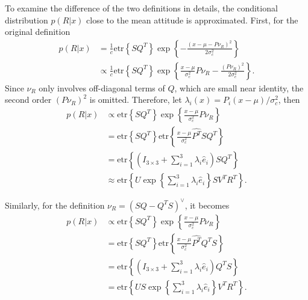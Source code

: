 \documentclass[10pt,twocolumn]{article}
\newcommand{\etr}[1]{\ensuremath{\mathrm{etr}\left\{ #1 \right\}}}
\begin{document}
To examine the difference of the two definitions in details, the conditional distribution $p(R|x)$ close to the mean attitude is approximated.
First, for the original definition
\begin{align*}
	p(R|x) &= \frac{1}{c}\etr{SQ^T}\exp\left\{ - \frac{(x-\mu-P\nu_R)^2}{2\sigma_c^2} \right\} \\
	&\propto \frac{1}{c}\etr{SQ^T} \exp\left\{ \frac{x-\mu}{\sigma_c^2}P\nu_R - \frac{(P\nu_R)^2}{2\sigma_c^2} \right\}.
\end{align*}
Since $\nu_R$ only involves off-diagonal terms of $Q$, which are small near identity, the second order $(P\nu_R)^2$ is omitted.
Therefore, let $\lambda_i(x) = P_i(x-\mu)/\sigma_c^2$, then
\begin{align*}
	p(R|x) &\propto \etr{SQ^T} \exp\left\{ \frac{x-\mu}{\sigma_c^2} P\nu_R \right\} \\
	&= \etr{SQ^T} \etr{\frac{x-\mu}{\sigma_c^2} \widehat{P^T}SQ^T} \\
	&= \etr{\left(I_{3\times 3}+\sum_{i=1}^3\lambda_i\hat{e}_i\right) SQ^T} \\
	&\approx \etr{U\exp\left\{ \sum_{i=1}^3\lambda_i\hat{e}_i \right\}SV^TR^T}.
\end{align*}

Similarly, for the definition $\nu_R = (SQ-Q^TS)^\vee$, it becomes
\begin{align*}
	p(R|x) &\propto \etr{SQ^T} \exp\left\{ \frac{x-\mu}{\sigma_c^2} P\nu_R \right\} \\
	&= \etr{SQ^T} \etr{\frac{x-\mu}{\sigma_c^2} \widehat{P^T}Q^TS} \\
	&= \etr{\left(I_{3\times 3}+\sum_{i=1}^3\lambda_i\hat{e}_i\right) Q^TS} \\
	&= \etr{US\exp\left\{ \sum_{i=1}^3\lambda_i\hat{e}_i \right\}V^TR^T}.
\end{align*}
\end{document}
